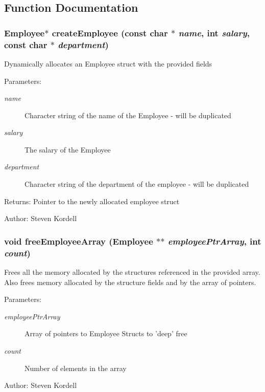\subsection{Function Documentation}
\subsubsection{\setlength{\rightskip}{0pt plus 5cm}\bf{Employee}$\ast$ create\-Employee (const char $\ast$ {\em name}, int {\em salary}, const char $\ast$ {\em department})}\label{employeef_8c_cfb476b211f5a9ecf37e52ae97b1e0be}


Dynamically allocates an Employee struct with the provided fields \begin{Desc}
\item[Parameters:]
\begin{description}
\item[{\em name}]Character string of the name of the Employee - will be duplicated \item[{\em salary}]The salary of the Employee \item[{\em department}]Character string of the department of the employee - will be duplicated \end{description}
\end{Desc}
\begin{Desc}
\item[Returns:]Pointer to the newly allocated employee struct \end{Desc}
\begin{Desc}
\item[Author:]Steven Kordell \end{Desc}
\subsubsection{\setlength{\rightskip}{0pt plus 5cm}void free\-Employee\-Array (\bf{Employee} $\ast$$\ast$ {\em employee\-Ptr\-Array}, int {\em count})}\label{employeef_8c_8a5aa9726b277df85bf9f7abe2ba1f87}


Frees all the memory allocated by the structures referenced in the provided array. Also frees memory allocated by the structure fields and by the array of pointers. \begin{Desc}
\item[Parameters:]
\begin{description}
\item[{\em employee\-Ptr\-Array}]Array of pointers to Employee Structs to 'deep' free \item[{\em count}]Number of elements in the array \end{description}
\end{Desc}
\begin{Desc}
\item[Author:]Steven Kordell \end{Desc}
